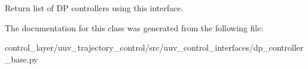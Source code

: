 \begin{DoxyVerb}Return list of DP controllers using this interface.\end{DoxyVerb}
 

The documentation for this class was generated from the following file\+:\begin{DoxyCompactItemize}
\item 
control\+\_\+layer/uuv\+\_\+trajectory\+\_\+control/src/uuv\+\_\+control\+\_\+interfaces/dp\+\_\+controller\+\_\+base.\+py\end{DoxyCompactItemize}
